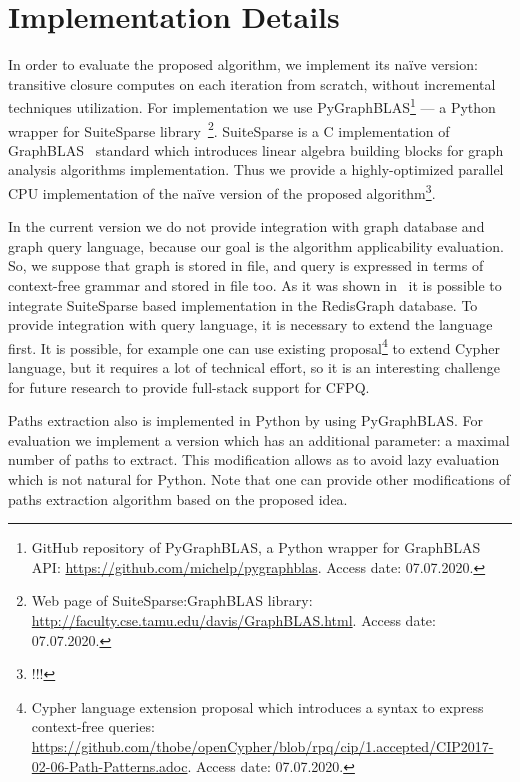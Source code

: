\section{Implementation Details}

In order to evaluate the proposed algorithm, we implement its na{\"i}ve version: transitive closure computes on each iteration from scratch, without incremental techniques utilization. 
For implementation we use PyGraphBLAS\footnote{GitHub repository of PyGraphBLAS, a Python wrapper for GraphBLAS API: \url{https://github.com/michelp/pygraphblas}. Access date: 07.07.2020.} --- a Python wrapper for SuiteSparse library~\cite{Davis2018Algorithm9S}\footnote{Web page of SuiteSparse:GraphBLAS library: \url{http://faculty.cse.tamu.edu/davis/GraphBLAS.html}. Access date: 07.07.2020.}. 
SuiteSparse is a C implementation of GraphBLAS~\cite{7761646} standard which introduces linear algebra building blocks for graph analysis algorithms implementation.
Thus we provide a highly-optimized parallel CPU implementation of the na{\"i}ve version of the proposed algorithm\footnote{!!!}. 

In the current version we do not provide integration with graph database and graph query language, because our goal is the algorithm applicability evaluation.
So, we suppose that graph is stored in file, and query is expressed in terms of context-free grammar and stored in file too.
As it was shown in~\cite{10.1145/3398682.3399163} it is possible to integrate SuiteSparse based implementation in the RedisGraph database. 
To provide integration with query language, it is necessary to extend the language first.
It is possible, for example one can use existing proposal\footnote{Cypher language extension proposal which introduces a syntax to express context-free queries: \url{https://github.com/thobe/openCypher/blob/rpq/cip/1.accepted/CIP2017-02-06-Path-Patterns.adoc}. Access date: 07.07.2020.} to extend Cypher language, but it requires a lot of technical effort, so it is an interesting challenge for future research to provide full-stack support for CFPQ.     

Paths extraction also is implemented in Python by using PyGraphBLAS. 
For evaluation we implement a version which has an additional parameter: a maximal number of paths to extract. 
This modification allows as to avoid lazy evaluation which is not natural for Python.
Note that one can provide other modifications of paths extraction algorithm based on the proposed idea.